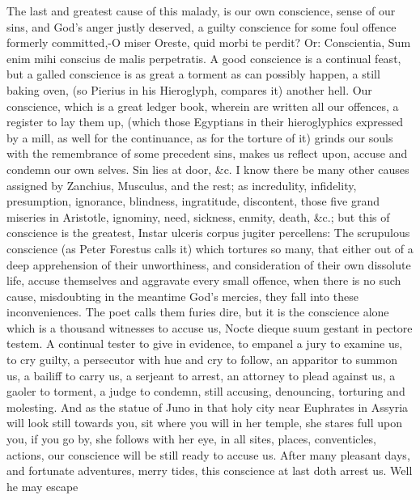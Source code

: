 {The last and greatest cause of this malady, is our own conscience,
sense of our sins, and God's anger justly deserved, a guilty conscience
for some foul offence formerly committed,-O miser Oreste, quid
morbi te perdit? Or: Conscientia, Sum enim mihi conscius de malis
perpetratis. A good conscience is a continual feast, but a galled
conscience is as great a torment as can possibly happen, a still baking
oven, (so Pierius in his Hieroglyph, compares it) another hell. Our
conscience, which is a great ledger book, wherein are written all our
offences, a register to lay them up, (which those Egyptians in
their hieroglyphics expressed by a mill, as well for the continuance,
as for the torture of it) grinds our souls with the remembrance of some
precedent sins, makes us reflect upon, accuse and condemn our own
selves. Sin lies at door, \&c. I know there be many other causes
assigned by Zanchius, Musculus, and the rest; as incredulity,
infidelity, presumption, ignorance, blindness, ingratitude, discontent,
those five grand miseries in Aristotle, ignominy, need, sickness,
enmity, death, \&c.; but this of conscience is the greatest,
Instar ulceris corpus jugiter percellens: The scrupulous
conscience (as Peter Forestus calls it) which tortures so many,
that either out of a deep apprehension of their unworthiness, and
consideration of their own dissolute life, accuse themselves and
aggravate every small offence, when there is no such cause, misdoubting
in the meantime God's mercies, they fall into these inconveniences. The
poet calls them furies dire, but it is the conscience alone which
is a thousand witnesses to accuse us,  Nocte dieque suum gestant
in pectore testem. A continual tester to give in evidence, to empanel a
jury to examine us, to cry guilty, a persecutor with hue and cry to
follow, an apparitor to summon us, a bailiff to carry us, a serjeant to
arrest, an attorney to plead against us, a gaoler to torment, a judge
to condemn, still accusing, denouncing, torturing and molesting. And as
the statue of Juno in that holy city near Euphrates in Assyria
will look still towards you, sit where you will in her temple, she
stares full upon you, if you go by, she follows with her eye, in all
sites, places, conventicles, actions, our conscience will be still
ready to accuse us. After many pleasant days, and fortunate adventures,
merry tides, this conscience at last doth arrest us. Well he may escape
}
